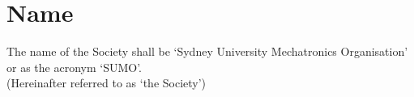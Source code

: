 \documentclass[11pt]{article}
\begin{document}


\begingroup 
\color{sumoblue}
\tableofcontents
\endgroup 

\pagebreak









\section{Name}
The name of the Society shall be ‘Sydney University Mechatronics Organisation’ or as the acronym ‘SUMO’. \\ (Hereinafter referred to as ‘the Society’)
\end{document}
